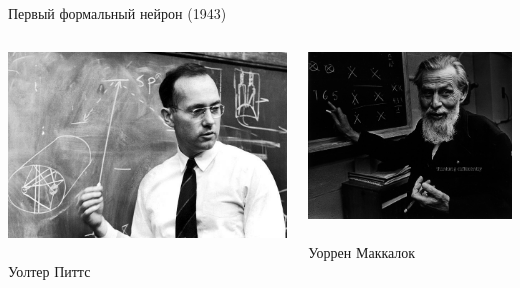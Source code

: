 \documentclass[notes,12pt, aspectratio=169]{beamer}
\begin{document}
\begin{frame}{Первый формальный нейрон (1943)}
\begin{columns}[T] %
	\begin{column}{.48\textwidth}
		\centering \includegraphics[scale=0.2]{pitts.jpg}\\
		\mbox{ } \\
		\color{blue} Уолтер Питтс
	\end{column}%
	\hfill%
	\begin{column}{.48\textwidth}
		\centering \includegraphics[scale=0.23]{makk.jpg}\\
		\mbox{ } \\
		\color{blue}  Уоррен Маккалок
	\end{column}%
\end{columns}
\end{frame}
\end{document}
